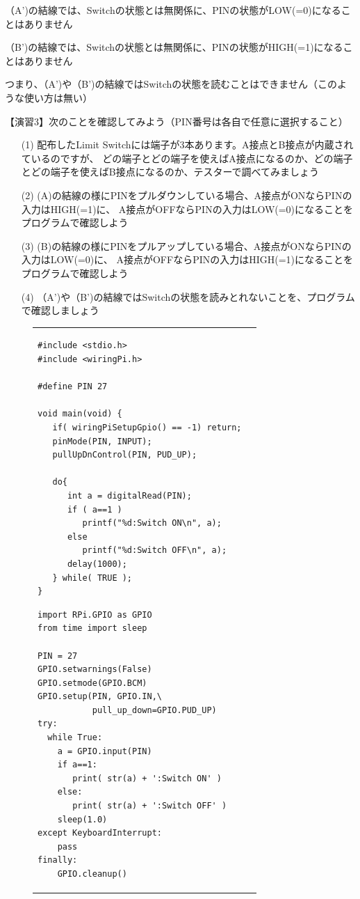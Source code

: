 \documentclass[uplatex,a4paper,11pt,oneside,openany]{jsbook}
\begin{document}
（A')の結線では、Switchの状態とは無関係に、PINの状態がLOW(=0)になることはありません

（B')の結線では、Switchの状態とは無関係に、PINの状態がHIGH(=1)になることはありません

つまり、（A')や（B')の結線ではSwitchの状態を読むことはできません（このような使い方は無い）

【演習3】次のことを確認してみよう（PIN番号は各自で任意に選択すること）

\begin{enumerate}
\item[(1)] 配布したLimit Switchには端子が3本あります。A接点とB接点が内蔵されているのですが、
どの端子とどの端子を使えばA接点になるのか、どの端子とどの端子を使えばB接点になるのか、テスターで調べてみましょう
\item[(2)] (A)の結線の様にPINをプルダウンしている場合、A接点がONならPINの入力はHIGH(=1)に、
A接点がOFFならPINの入力はLOW(=0)になることをプログラムで確認しよう
\item[(3)] (B)の結線の様にPINをプルアップしている場合、A接点がONならPINの入力はLOW(=0)に、
A接点がOFFならPINの入力はHIGH(=1)になることをプログラムで確認しよう
\item[(4)]（A')や（B')の結線ではSwitchの状態を読みとれないことを、プログラムで確認しましょう\\
\end{enumerate}

\begin{figure}[htpb]
    \begin{tabular}{lr}
      \begin{minipage}{0.5\hsize}
\begin{lstlisting}[caption=Switch(C言語),label=prog2]
#include <stdio.h>
#include <wiringPi.h>

#define PIN 27

void main(void) {
   if( wiringPiSetupGpio() == -1) return;
   pinMode(PIN, INPUT);
   pullUpDnControl(PIN, PUD_UP);

   do{
      int a = digitalRead(PIN);
      if ( a==1 )
         printf("%d:Switch ON\n", a);
      else
         printf("%d:Switch OFF\n", a);
      delay(1000);
   } while( TRUE );
}
\end{lstlisting}
    \end{minipage}

    \begin{minipage}{0.5\hsize}
    \begin{lstlisting}[caption=Switch(Python),label=prog4]
import RPi.GPIO as GPIO
from time import sleep

PIN = 27
GPIO.setwarnings(False)
GPIO.setmode(GPIO.BCM)
GPIO.setup(PIN, GPIO.IN,\
           pull_up_down=GPIO.PUD_UP)
try:
  while True:
    a = GPIO.input(PIN)
    if a==1:
       print( str(a) + ':Switch ON' )
    else:
       print( str(a) + ':Switch OFF' )
    sleep(1.0)
except KeyboardInterrupt:
    pass
finally:
    GPIO.cleanup()
    \end{lstlisting}%
    \end{minipage}
  \end{tabular}
\end{figure}%
\end{document}
